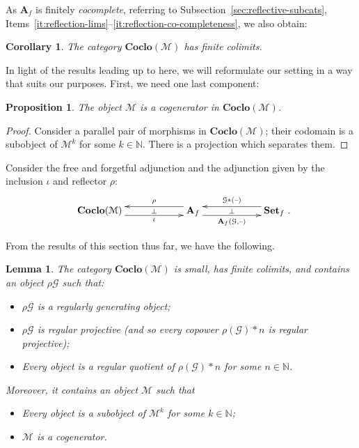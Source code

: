 \documentclass[11pt, a4paper, twoside,leqno]{amsart}
\newcommand{\cat}[1]{\mathbf{#1}}
\newcommand{\thg}{{\mathord{\text{--}}}}
\newcommand{\cd}[2][]{\vcenter{\hbox{\xymatrix#1{#2}}}}
\numberwithin{equation}{section}
\theoremstyle{plain}
\newtheorem{Prop}[Thm]{Proposition}
\newtheorem{Cor}[Thm]{Corollary}
\newtheorem{Lemma}[Thm]{Lemma}
\theoremstyle{definition}
\newcommand{\Set}{\cat{Set}}
\begin{document}
As \(\cat{A}_{f}\)
is finitely \emph{cocomplete}, referring to Subsection~\ref{sec:reflective-subcats},
Items~\ref{it:reflection-lims}--\ref{it:reflection-co-completeness},
we also obtain: 
\begin{Cor}
  \label{cor:S-fin-colims}
  The category \(\cat{Coclo(\mathcal{M})}\) has finite
  colimits.
\end{Cor}

In light of the results leading up to here, we will reformulate our
setting in a way that suits our purposes. First, we need one last
component:

\begin{Prop}
  \label{prop:M-cogen}
  The object \(\mathcal{M}\) is a cogenerator in \(\cat{Coclo}(\mathcal{M})\).
\end{Prop}

\begin{proof}
  Consider a parallel pair of morphisms in
  \(\cat{Coclo}(\mathcal{M})\); their codomain is a subobject of
  \(\mathcal{M}^{k}\) for some \(k\in \mathbb{N}
  \). There is a projection which separates them.
\end{proof}

Consider the free and forgetful adjunction and the adjunction given by
the inclusion \(\iota\) and
reflector \(\rho\):
\begin{equation}
  \label{eq:29}
  \xymatrixcolsep{5pc}
  \xymatrixrowsep{3.5pc}
  \cd{
    {\cat{Coclo}(\mathcal{M})}
    \ar@<-4.5pt>[r]_-{\iota} \ar@{<-}@<4.5pt>[r]^-{\rho} \ar@{}[r]|-{\bot} &
    {\cat{A}_{f}}
    \ar@<-4.5pt>[r]_-{\cat{A}_{f}(\mathcal{G}, \thg)} \ar@{<-}@<4.5pt>[r]^-{\mathcal{G}\ast (\thg)} \ar@{}[r]|-{\bot} &
    {\Set_{f}}
    \rlap{ .}
  }
\end{equation}

From the results of this section thus far, we have the following.
\begin{Lemma}
  \label{lem:coclo-M-theory}
  The category \(\cat{Coclo(\mathcal{M})}\) is small, has finite colimits, and contains an object \(\rho\mathcal{G}\)
  such that:
  \begin{itemize}
  \item
    \(\rho\mathcal{G}\) is a regularly generating object;
    
  \item 
    \(\rho\mathcal{G}\) is regular projective (and so every copower
    \(\rho(\mathcal{G})\ast n \) is
    regular projective);

  \item
    Every object is a regular quotient of \(\rho(\mathcal{G})\ast n\) for some
    \(n \in \mathbb{N}\).
  \end{itemize}
  Moreover, it contains an object \(\mathcal{M}\) such that
  \begin{itemize}
  \item  Every object is a subobject of \(\mathcal{M}^{k}\) for some \(k \in
    \mathbb{N}\);
  \item
    \(\mathcal{M}\) is a cogenerator.
  \end{itemize}
\end{Lemma}
\end{document}
